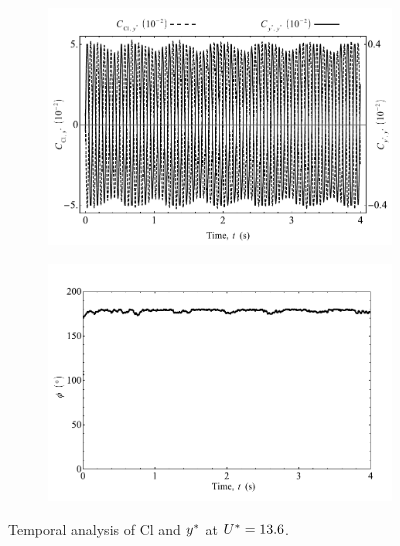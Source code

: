 \documentclass[oneside]{utmthesis}
\begin{document}
\begin{figure}
  \centering
  \begin{subfigure}[h]{1\textwidth}
    \includegraphics[width=\textwidth]{figs/tempAnalysisLower-a}
    \caption{}
    \label{fig:tempAnalysisLower-a}
  \end{subfigure}

  \begin{subfigure}[h]{1\textwidth}
    \includegraphics[width=\textwidth]{figs/tempAnalysisLower-b}
    \caption{}
    \label{fig:tempAnalysisLower-b}
  \end{subfigure}
  \caption{Temporal analysis of Cl and $y^{*}$ at $U^{*} = 13.6$.}
\end{figure}
\end{document}
